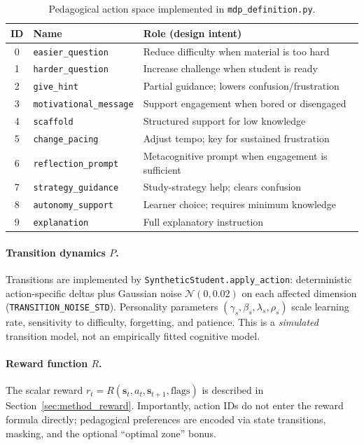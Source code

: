 \begin{table}[H]
\centering
\caption{Pedagogical action space implemented in \texttt{mdp\_definition.py}.}
\label{tab:actions}
\begin{tabular}{clp{7.2cm}}
\toprule
\textbf{ID} & \textbf{Name} & \textbf{Role (design intent)} \\
\midrule
0 & \texttt{easier\_question} & Reduce difficulty when material is too hard \\
1 & \texttt{harder\_question} & Increase challenge when student is ready \\
2 & \texttt{give\_hint} & Partial guidance; lowers confusion/frustration \\
3 & \texttt{motivational\_message} & Support engagement when bored or disengaged \\
4 & \texttt{scaffold} & Structured support for low knowledge \\
5 & \texttt{change\_pacing} & Adjust tempo; key for sustained frustration \\
6 & \texttt{reflection\_prompt} & Metacognitive prompt when engagement is sufficient \\
7 & \texttt{strategy\_guidance} & Study-strategy help; clears confusion \\
8 & \texttt{autonomy\_support} & Learner choice; requires minimum knowledge \\
9 & \texttt{explanation} & Full explanatory instruction \\
\bottomrule
\end{tabular}
\end{table}

\paragraph{Transition dynamics $P$.}
Transitions are implemented by \texttt{SyntheticStudent.apply\_action}: deterministic action-specific deltas plus Gaussian noise $\mathcal{N}(0, 0.02)$ on each affected dimension (\texttt{TRANSITION\_NOISE\_STD}). Personality parameters $(\gamma_s, \beta_s, \lambda_s, \rho_s)$ scale learning rate, sensitivity to difficulty, forgetting, and patience. This is a \emph{simulated} transition model, not an empirically fitted cognitive model.

\paragraph{Reward function $R$.}
The scalar reward $r_t = R(\mathbf{s}_t, a_t, \mathbf{s}_{t+1}, \text{flags})$ is described in Section~\ref{sec:method_reward}. Importantly, action IDs do not enter the reward formula directly; pedagogical preferences are encoded via state transitions, masking, and the optional ``optimal zone'' bonus.


